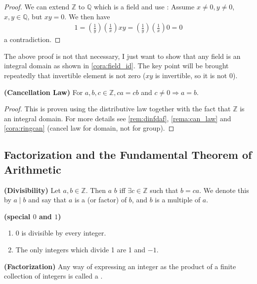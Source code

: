 \documentclass{article}
\newcommand{\bfs}[1]{\textbf{({#1}) }}
\begin{document}
\begin{proof}
We can extend $\mathbb{Z}$ to $\mathbb{Q}$ which is a field and use \cite[Page 7]{rudin1976principles}:
Assume $x \neq 0, y \neq 0$, $x,y\in\mathbb{Q}$, but $x y=0 .$ We then have
\begin{align}
1=\left(\frac{1}{y}\right)\left(\frac{1}{x}\right) x y=\left(\frac{1}{y}\right)\left(\frac{1}{x}\right) 0=0
\end{align}
a contradiction.
\end{proof}
\begin{rema}
The above proof is not that necessary, I just want to show that any field is an integral domain as shown in \cref{cora:field_id}. The key point will be brought repeatedly that invertible element is not zero ($xy$ is invertible, so it is not $0$).
\end{rema}

\begin{cora}{\bfs{Cancellation Law}}\label{cora:z_can_law} For $a, b, c \in \mathbb{Z}, c a=c b$ and $c \neq 0 \Rightarrow a=b$.
\end{cora}
\begin{proof}
This is proven using the distributive law together with the fact that $\mathbb{Z}$ is an integral domain. For more details see \cref{rem:dinfdaf}, \cref{rema:can_law} and \cref{cora:ringcan} (cancel law for domain, not for group). 
\end{proof}

\subsection{Factorization and the Fundamental Theorem of Arithmetic}
\begin{defa}{\bfs{Divisibility}}
 Let $a, b \in \mathbb{Z}$. Then 
 $a$  $b$ iff $\exists c \in \mathbb{Z}$ such that $b=c a$. We denote this by $a \mid b$ and say that $a$ is a  (or factor) of $b$, and $b$ is a multiple of $a$.
\end{defa}
\begin{rema}{\bfs{special $0$ and $1$}}
\begin{enumerate}
    \item $0$ is divisible by every integer.
    \item The only integers which divide 1 are 1 and $-1$. 
\end{enumerate}
 
\end{rema}  

\begin{defa}{\bfs{Factorization}}
 Any way of expressing an integer as the product of a finite collection of integers is called a .
\end{defa}
\end{document}
